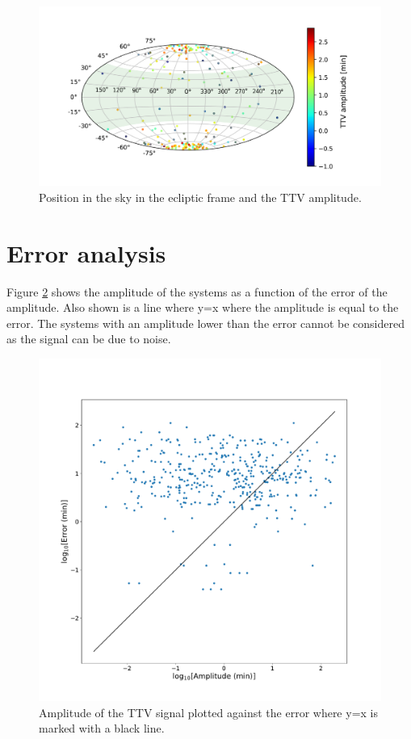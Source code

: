 \documentclass[12pt]{report}
\begin{document}
\begin{figure}[h!]
 	 \centering
	  \includegraphics[width=\textwidth]{img/skymap_TESS_amp_-1_new.pdf}
	  \caption{Position in the sky in the ecliptic frame and the TTV amplitude.}
	 \label{fig:skymap_amp}
\end{figure}
\section{Error analysis}
		Figure \ref{fig:amp_error} shows the amplitude of the systems as a function of the error of the amplitude. Also shown is a line where y=x where the amplitude is equal to the error. The systems with an amplitude lower than the error cannot be considered as the signal can be due to noise.
\begin{figure}
 	 \centering
	  \includegraphics[width=\textwidth]{img/ampErrorLog.pdf}
	  \caption{Amplitude of the TTV signal plotted against the error where y=x is marked with a black line.}
	 \label{fig:amp_error}
\end{figure}
\end{document}
